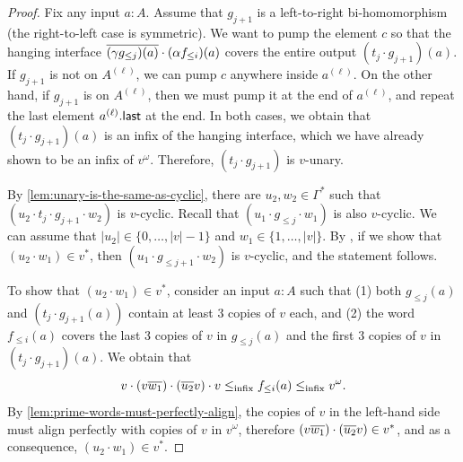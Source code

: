 \begin{proof}
    Fix any input $a : A$. Assume that $g_{j+1}$ is a left-to-right bi-homomorphism (the right-to-left case is symmetric). We want to pump the element $c$ so that the hanging interface $\overline{(\gamma g_{\leq j})(a)} \cdot (\alpha f_{\leq i})(a)$ covers the entire output $(t_j \cdot g_{j+1})(a)$. If $g_{j+1}$ is not on $A^{(\ell)}$, we can pump $c$ anywhere inside $a^{(\ell)}$. On the other hand, if $g_{j+1}$ is on $A^{(\ell)}$, then we must pump it at the end of $a^{(\ell)}$, and repeat the last element $a^{(\ell)} . \mathsf{last}$ at the end. In both cases, we obtain that $(t_j \cdot g_{j+1})(a)$ is an infix of the hanging interface, which we have already shown to be an infix of $v^\omega$. Therefore, $(t_j \cdot g_{j+1})$ is $v$-unary.

    By \cref{lem:unary-is-the-same-as-cyclic}, there are $u_2, w_2 \in \Gamma^*$ such that $(u_2 \cdot t_j \cdot g_{j+1} \cdot w_2)$ is $v$-cyclic. Recall that $(u_1 \cdot g_{\leq j} \cdot w_1)$ is also $v$-cyclic. We can assume that $|u_2| \in \{0, \dots, |v| - 1 \}$ and $w_1 \in \{1, \dots, |v| \}$. By , if we show that $(u_2 \cdot w_1) \in v^*$, then $(u_1 \cdot g_{\leq j+1} \cdot w_2)$ is $v$-cyclic, and the statement follows.

    To show that $(u_2 \cdot w_1) \in v^*$, consider an input $a : A$ such that (1) both $g_{\leq j}(a)$ and $(t_j \cdot g_{j+1}(a))$ contain at least 3 copies of $v$ each, and (2) the word $f_{\leq i}(a)$ covers the last 3 copies of $v$ in $g_{\leq j}(a)$ and the first 3 copies of $v$ in $(t_j \cdot g_{j+1})(a)$. We obtain that
    \[
        v \cdot (v \overline{w_1}) \cdot (\overline{u_2} v) \cdot v \leq_{\mathrm{infix}} f_{\leq i}(a) \leq_{\mathrm{infix}} v^\omega.
    \]
    By \cref{lem:prime-words-must-perfectly-align}, the copies of $v$ in the left-hand side must align perfectly with copies of $v$ in $v^\omega$, therefore $(v \overline{w_1}) \cdot (\overline{u_2} v) \in v^*$, and as a consequence, $(u_2 \cdot w_1) \in v^*$.
\end{proof}
